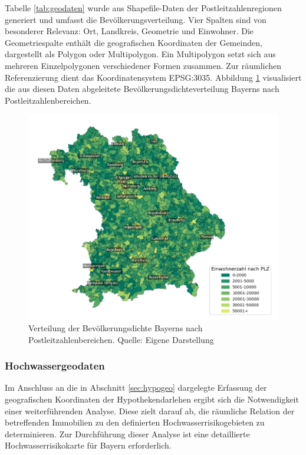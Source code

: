 Tabelle \ref{tab:geodaten} wurde aus Shapefile-Daten der Postleitzahlenregionen generiert und umfasst die Bevölkerungsverteilung. Vier Spalten sind von besonderer Relevanz: Ort, Landkreis, Geometrie und Einwohner. Die Geometriespalte enthält die geografischen Koordinaten der Gemeinden, dargestellt als Polygon oder Multipolygon. Ein Multipolygon setzt sich aus mehreren Einzelpolygonen verschiedener Formen zusammen. Zur räumlichen Referenzierung dient das Koordinatensystem EPSG:3035. Abbildung \ref{fig:bevoelkerungsdichte} visualisiert die aus diesen Daten abgeleitete Bevölkerungsdichteverteilung Bayerns nach Postleitzahlenbereichen.

\begin{figure}[htbp]
    \centering
    \includegraphics[width=1\textwidth]{figures/Bayern_pop_plz.png}
    \caption{Verteilung der Bevölkerungsdichte Bayerns nach Postleitzahlenbereichen. Quelle: Eigene Darstellung}
    \label{fig:bevoelkerungsdichte}
\end{figure}
\FloatBarrier



\subsubsection{Hochwassergeodaten}\label{sec:hochgeo}

Im Anschluss an die in Abschnitt \ref{sec:hypogeo} dargelegte Erfassung der geografischen Koordinaten der Hypothekendarlehen ergibt sich die Notwendigkeit einer weiterführenden Analyse. Diese zielt darauf ab, die räumliche Relation der betreffenden Immobilien zu den definierten Hochwasserrisikogebieten zu determinieren. Zur Durchführung dieser Analyse ist eine detaillierte Hochwasserrisikokarte für Bayern erforderlich.


